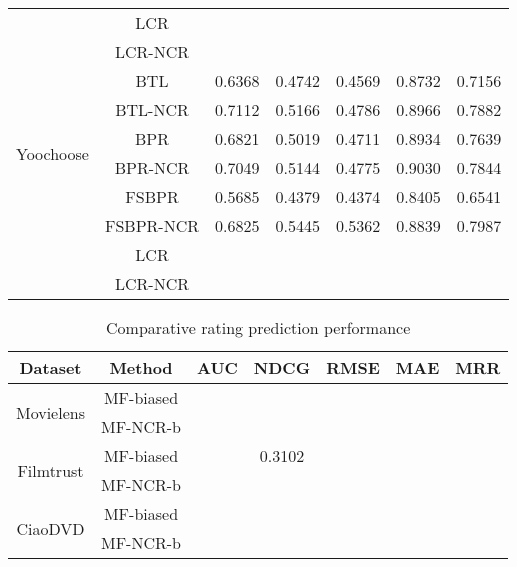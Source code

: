 \documentclass[letterpaper]{article} %
\begin{document}
\begin{table}[htp]
\begin{center}
\begin{tabular}{|c|c|c|c|c|c|c|}
   & LCR & & & & & \\\cline{2-7}
 & LCR-NCR & & & & & \\\hline
\multirow{6}{*}{Yoochoose} & BTL &0.6368 &0.4742 &0.4569 &0.8732 &0.7156 \\\cline{2-7}
 & BTL-NCR &0.7112 &0.5166 &0.4786 &0.8966 &0.7882 \\\cline{2-7}
 & BPR &0.6821 &0.5019 &0.4711 &0.8934 &0.7639 \\\cline{2-7}
 & BPR-NCR &0.7049 &0.5144 &0.4775 &0.9030 &0.7844 \\\cline{2-7}
 & FSBPR &0.5685 &0.4379 &0.4374 &0.8405 &0.6541\\\cline{2-7}
  & FSBPR-NCR &0.6825 &0.5445 &0.5362 &0.8839 &0.7987  \\\cline{2-7}
   & LCR & & & & & \\\cline{2-7}
 & LCR-NCR & & & & & \\\hline
\end{tabular}
\end{center}
\label{tab:ratingresult}
\end{table}%





\begin{table}[htp]
\tiny
\caption{Comparative rating prediction performance}
\begin{center}
\begin{tabular}{|c|c|c|c|c|c|c|}
\hline
Dataset & Method & AUC & NDCG & RMSE & MAE & MRR \\\hline
\multirow{2}{*}{Movielens} & MF-biased &  & 	 &	 &	 &	
 \\\cline{2-7}
 & MF-NCR-b & & & &	 &	
 \\\hline
\multirow{2}{*}{Filmtrust} & MF-biased & &0.3102	 &	 	&  &	
 \\\cline{2-7}
 & MF-NCR-b &  & &	 & 	 & 	
\\\hline
 \multirow{2}{*}{CiaoDVD} & MF-biased & & 	 &	 & 	 	 &
\\\cline{2-7}
 & MF-NCR-b & & 	 &	 &	 	&
 \\\hline
\end{tabular}
\end{center}
\label{tab:biasresult}
\end{table}%
\end{document}
